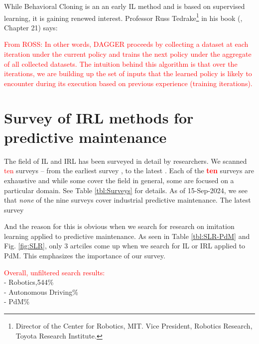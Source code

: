 \documentclass{article}
\begin{document}
While Behavioral Cloning is an an early IL method and is based on supervised learning, it is gaining renewed interest. Professor Russ Tedrake\footnote{Director of the Center for Robotics, MIT. Vice President, Robotics Research, Toyota Research Institute.} in his book (\cite{Russ2024}, Chapter 21) says:


\textcolor{red}{From ROSS: In other words, DAGGER proceeds by collecting a dataset 	at each iteration under the current policy and trains the next 	policy under the aggregate of all collected datasets. The intuition 	behind this algorithm is that over the iterations, we 	are building up the set of inputs that the learned policy is 	likely to encounter during its execution based on previous experience (training iterations).}

\section{Survey of IRL methods for predictive maintenance}\label{sec:SLR}

The field of IL and IRL has been surveyed in detail by researchers. We scanned \textcolor{red}{ten} surveys -- from the earliest survey \citet{Osa-2018}, to the latest \citet{zare2024survey}. Each of the \textbf{\textcolor{red}{ten}} surveys are exhaustive and while some cover the field in general, some are focused on a particular domain. See Table \ref{tbl:Surveys} for details. As of 15-Sep-2024, we see that \textit{none} of the nine surveys cover industrial predictive maintenance. The latest survey \citet{zare2024survey}

And the reason for this is obvious when we search for research on imitation learning applied to predictive maintenance. As seen in Table \ref{tbl:SLR-PdM} and Fig. \ref{fig:SLR}, only 3 artciles come up when we search for IL or IRL applied to PdM. This emphasizes the importance of our survey. \\

\par
\textcolor{red}{Overall, unfiltered search results:}\\
\qquad	- Robotics,544\%\\
\qquad	- Autonomous Driving\%\\
\qquad - PdM\%\\ \par
\end{document}
